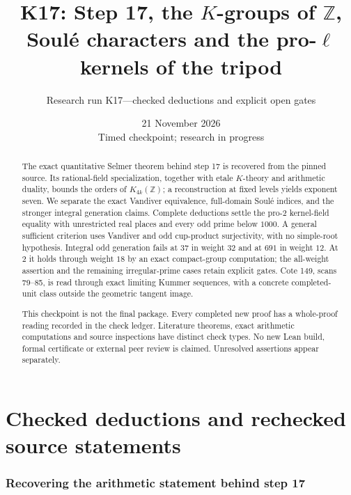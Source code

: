 \documentclass[11pt,a4paper]{article}
\title{K17: Step 17, the $K$-groups of $\mathbb Z$,\\
Soul\'e characters and the pro-$\ell$ kernels of the tripod}
\author{Research run K17---checked deductions and explicit open gates}
\date{21 November 2026\\Timed checkpoint; research in progress}
\theoremstyle{definition}
\begin{document}
\maketitle
\begin{abstract}
The exact quantitative Selmer theorem behind step 17 is recovered from
the pinned source. Its rational-field specialization, together with
etale $K$-theory and arithmetic duality, bounds the orders of
$K_{4k}(\mathbb Z)$; a reconstruction at fixed levels yields exponent
seven. We separate the exact Vandiver equivalence, full-domain Soul\'e
indices, and the stronger integral generation claims. Complete
deductions settle the pro-$2$ kernel-field equality with unrestricted
real places and every odd prime below $1000$. A general sufficient
criterion uses Vandiver and odd cup-product surjectivity, with no
simple-root hypothesis. Integral odd generation fails at $37$ in
weight $32$ and at $691$ in weight $12$. At $2$ it holds through
weight $18$ by an exact compact-group computation; the all-weight
assertion and the remaining irregular-prime cases retain explicit gates. Cote 149, scans
79--85, is read through exact limiting Kummer sequences, with a concrete
completed-unit class outside the geometric tangent image.

This checkpoint is not the final package. Every completed new proof
has a whole-proof reading recorded in the check ledger. Literature
theorems, exact arithmetic computations and source inspections have
distinct check types. No new Lean build, formal certificate or external
peer review is claimed. Unresolved assertions appear separately.
\end{abstract}
\tableofcontents
\clearpage
\part{Checked deductions and rechecked source statements}

\section{Recovering the arithmetic statement behind step 17}
\label{sec:step17}
\end{document}
